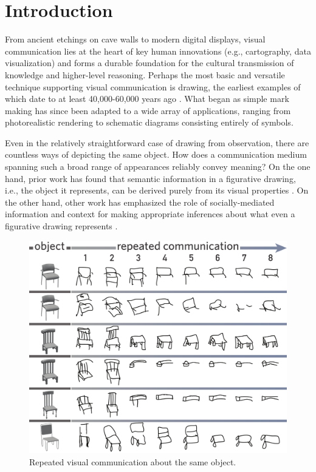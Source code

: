 \documentclass[10pt,letterpaper]{article}
\begin{document}
\section{Introduction}

From ancient etchings on cave walls to modern digital displays, visual communication lies at the heart of key human innovations (e.g., cartography, data visualization) and forms a durable foundation for the cultural transmission of knowledge and higher-level reasoning.
Perhaps the most basic and versatile technique supporting visual communication is drawing, the earliest examples of which date to at least 40,000-60,000 years ago \cite{hoffmann2018u}.
What began as simple mark making has since been adapted to a wide array of applications, ranging from photorealistic rendering to schematic diagrams consisting entirely of symbols.

Even in the relatively straightforward case of drawing from observation, there are countless ways of depicting the same object.
How does a communication medium spanning such a broad range of appearances reliably convey meaning?
On the one hand, prior work has found that semantic information in a figurative drawing, i.e., the object it represents, can be derived purely from its visual properties \cite{FanCommon2018}.
On the other hand, other work has emphasized the role of socially-mediated information and context for making appropriate inferences about what even a figurative drawing represents \cite{goodman1976languages}.

\begin{figure}
\begin{center}
\includegraphics[width=0.75\linewidth]{figures/sketch_gallery.pdf}
\caption{Repeated visual communication about the same object.}
\label{sketch_gallery}
\end{center}
\vspace{-1em}
\end{figure}
\end{document}
